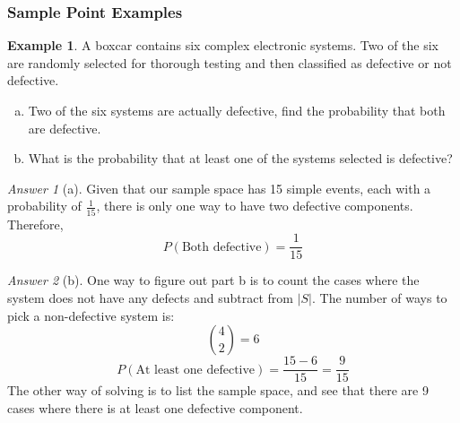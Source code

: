 \documentclass{article}
\theoremstyle{plain}
\theoremstyle{definition}
\newtheorem{example}{Example}[section]
\theoremstyle{remark}
\newtheorem*{answer}{Answer}
\begin{document}
\subsubsection{Sample Point Examples}
\begin{example}
  A boxcar contains six complex electronic systems. Two of the six are randomly selected for thorough testing and then classified as defective or not defective. 
  \begin{enumerate}[a)]
    \item Two of the six systems are actually defective, find the probability that both are defective.      
    \item What is the probability that at least one of the systems selected is defective?    
  \end{enumerate}
  \begin{answer}[a]
    Given that our sample space has 15 simple events, each with a probability of $\frac{1}{15}$, there is only one way to have two defective components. Therefore, 
    $$
    P(\text{Both defective}) = \frac{1}{15}
    $$
  \end{answer}
  \begin{answer}[b]
    One way to figure out part b is to count the cases where the system does not have any defects and subtract from $|S|$. The number of ways to pick a non-defective system is:
$$
{4 \choose 2} = 6
$$
$$
P(\text{At least one defective}) = \frac{15-6}{15} = \frac{9}{15}
$$
The other way of solving is to list the sample space, and see that there are 9 cases where there is at least one defective component.
  \end{answer}
\end{example}
\end{document}

